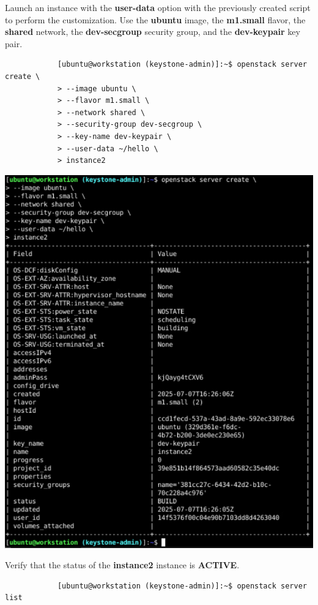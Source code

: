 \documentclass[letterpaper, 12pt]{article}
\begin{document}
\begin{enumerate}
    \begin{labstep}
        Launch an instance with the \textbf{user-data} option with the previously created script to perform the customization.
        Use the \textbf{ubuntu} image, the \textbf{m1.small} flavor, the \textbf{shared} network, the \textbf{dev-secgroup} security group, and the \textbf{dev-keypair} key pair.
        \begin{lstlisting}
            [ubuntu@workstation (keystone-admin)]:~$ openstack server create \
            > --image ubuntu \
            > --flavor m1.small \
            > --network shared \
            > --security-group dev-secgroup \
            > --key-name dev-keypair \
            > --user-data ~/hello \
            > instance2
        \end{lstlisting}

        \begin{center}
            \includegraphics[scale=0.7]{images/part3/step3.png}
        \end{center}
    \end{labstep}

    \begin{labstep}
        Verify that the status of the \textbf{instance2} instance is \textbf{ACTIVE}.
        \begin{lstlisting}
            [ubuntu@workstation (keystone-admin)]:~$ openstack server list
        \end{lstlisting}


\end{labstep}
\end{enumerate}
\end{document}
